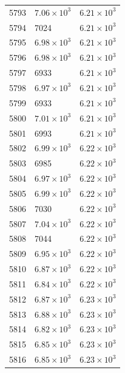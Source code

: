 \begin{table}[H]
\begin{tabular}{lll}
5793 & $\displaystyle 7.06 \times 10^{3}$ & $\displaystyle 6.21 \times 10^{3}$ \\
5794 & 7024 & $\displaystyle 6.21 \times 10^{3}$ \\
5795 & $\displaystyle 6.98 \times 10^{3}$ & $\displaystyle 6.21 \times 10^{3}$ \\
5796 & $\displaystyle 6.98 \times 10^{3}$ & $\displaystyle 6.21 \times 10^{3}$ \\
5797 & 6933 & $\displaystyle 6.21 \times 10^{3}$ \\
5798 & $\displaystyle 6.97 \times 10^{3}$ & $\displaystyle 6.21 \times 10^{3}$ \\
5799 & 6933 & $\displaystyle 6.21 \times 10^{3}$ \\
5800 & $\displaystyle 7.01 \times 10^{3}$ & $\displaystyle 6.21 \times 10^{3}$ \\
5801 & 6993 & $\displaystyle 6.21 \times 10^{3}$ \\
5802 & $\displaystyle 6.99 \times 10^{3}$ & $\displaystyle 6.22 \times 10^{3}$ \\
5803 & 6985 & $\displaystyle 6.22 \times 10^{3}$ \\
5804 & $\displaystyle 6.97 \times 10^{3}$ & $\displaystyle 6.22 \times 10^{3}$ \\
5805 & $\displaystyle 6.99 \times 10^{3}$ & $\displaystyle 6.22 \times 10^{3}$ \\
5806 & 7030 & $\displaystyle 6.22 \times 10^{3}$ \\
5807 & $\displaystyle 7.04 \times 10^{3}$ & $\displaystyle 6.22 \times 10^{3}$ \\
5808 & 7044 & $\displaystyle 6.22 \times 10^{3}$ \\
5809 & $\displaystyle 6.95 \times 10^{3}$ & $\displaystyle 6.22 \times 10^{3}$ \\
5810 & $\displaystyle 6.87 \times 10^{3}$ & $\displaystyle 6.22 \times 10^{3}$ \\
5811 & $\displaystyle 6.84 \times 10^{3}$ & $\displaystyle 6.22 \times 10^{3}$ \\
5812 & $\displaystyle 6.87 \times 10^{3}$ & $\displaystyle 6.23 \times 10^{3}$ \\
5813 & $\displaystyle 6.88 \times 10^{3}$ & $\displaystyle 6.23 \times 10^{3}$ \\
5814 & $\displaystyle 6.82 \times 10^{3}$ & $\displaystyle 6.23 \times 10^{3}$ \\
5815 & $\displaystyle 6.85 \times 10^{3}$ & $\displaystyle 6.23 \times 10^{3}$ \\
5816 & $\displaystyle 6.85 \times 10^{3}$ & $\displaystyle 6.23 \times 10^{3}$ \\

\end{tabular}
\end{table}
